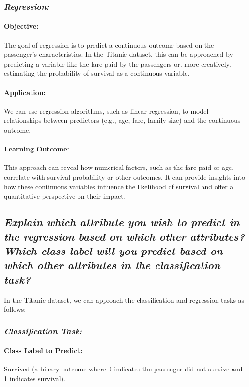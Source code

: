 \documentclass[twoside,11pt]{article}
\makeatletter
\let\@oldsubsection\subsection
\renewcommand\subsection[1]{\@oldsubsection*{\textit{#1}}}
\let\@oldsubsubsection\subsubsection
\renewcommand\subsubsection[1]{\@oldsubsubsection*{\textit{#1}}}
\makeatother
\begin{document}
\subsubsection{Regression:}

\paragraph{Objective:} The goal of regression is to predict a continuous outcome based on the passenger's characteristics. In the Titanic dataset, this can be approached by predicting a variable like the fare paid by the passengers or, more creatively, estimating the probability of survival as a continuous variable.

\paragraph{Application:} We can use regression algorithms, such as linear regression, to model relationships between predictors (e.g., age, fare, family size) and the continuous outcome.

\paragraph{Learning Outcome:} This approach can reveal how numerical factors, such as the fare paid or age, correlate with survival probability or other outcomes. It can provide insights into how these continuous variables influence the likelihood of survival and offer a quantitative perspective on their impact.

\subsection{Explain which attribute you wish to predict in the regression based on which other attributes? Which class label will you predict based on which other attributes in the classification task?}

In the Titanic dataset, we can approach the classification and regression tasks as follows:

\subsubsection{Classification Task:}

\paragraph{Class Label to Predict:} Survived (a binary outcome where 0 indicates the passenger did not survive and 1 indicates survival).
\end{document}
